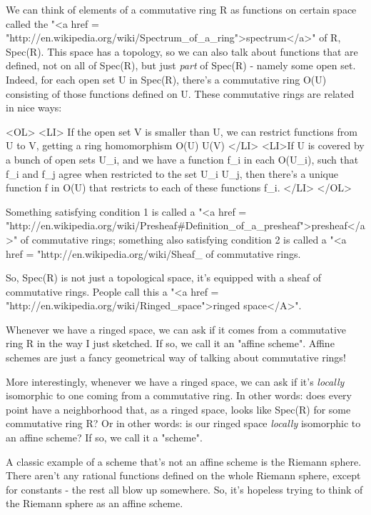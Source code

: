 We can think of elements of a commutative ring R as functions on
certain space called the "<a href =
"http://en.wikipedia.org/wiki/Spectrum_of_a_ring">spectrum</a>"
of R, Spec(R).  This space has a topology, so we can also talk about
functions that are defined, not on all of Spec(R), but just
\emph{part} of Spec(R) - namely some open set.  Indeed, for each
open set U in Spec(R), there's a commutative ring O(U) consisting of
those functions defined on U.  These commutative rings are related in
nice ways:

<OL>
<LI>
If the open set V is smaller than U, we can restrict functions from 
U to V, getting a ring homomorphism O(U) \to  U(V)
</LI>
<LI>If U is covered by a bunch of open sets U_{i}, and we have
a function f_{i} in each O(U_{i}), such that
f_{i} and f_{j} agree when restricted to the set
U_{i} \cap  U_{j}, then there's a unique function f in
O(U) that restricts to each of these functions f_{i}.  </LI>
</OL>

Something satisfying condition 1 is called a "<a href =
"http://en.wikipedia.org/wiki/Presheaf#Definition_of_a_presheaf">presheaf</a>"
of commutative rings; something also satisfying condition 2 is called
a "<a href =
"http://en.wikipedia.org/wiki/Sheaf_%
of commutative rings.

So, Spec(R) is not just a topological space, it's equipped with a
sheaf of commutative rings.  People call this a "<a href =
"http://en.wikipedia.org/wiki/Ringed_space">ringed space</A>".

Whenever we have a ringed space, we can ask if it comes from a
commutative ring R in the way I just sketched.  If so, we call it an
"affine scheme".  Affine schemes are just a fancy
geometrical way of talking about commutative rings!

More interestingly, whenever we have a ringed space, we can ask if
it's \emph{locally} isomorphic to one coming from a commutative ring.  
In other words: does every point have a neighborhood that, as a
ringed space, looks like Spec(R) for some commutative ring R?
Or in other words: is our ringed space \emph{locally} isomorphic to an
affine scheme?  If so, we call it a "scheme".  

A classic example of a scheme that's not an affine scheme is the
Riemann sphere.  There aren't any rational functions defined on the
whole Riemann sphere, except for constants - the rest all blow up 
somewhere.  So, it's hopeless trying to think of the Riemann sphere
as an affine scheme.

